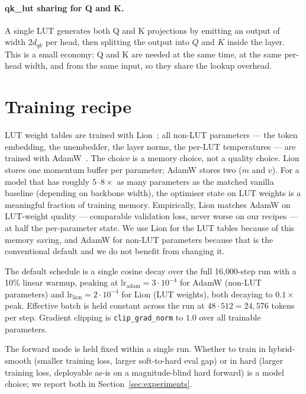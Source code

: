 \documentclass[11pt]{article}
\newcommand{\dqk}{d_{qk}}
\begin{document}
\paragraph{qk\_lut sharing for Q and K.} A single LUT generates both Q and K projections by emitting an output of width $2 \dqk$ per head, then splitting the output into $Q$ and $K$ inside the layer. This is a small economy: Q and K are needed at the same time, at the same per-head width, and from the same input, so they share the lookup overhead.

\FloatBarrier

\section{Training recipe}
\label{sec:training}

LUT weight tables are trained with Lion~\citep{chen2023lion}; all non-LUT parameters --- the token embedding, the unembedder, the layer norms, the per-LUT temperatures --- are trained with AdamW~\citep{loshchilov2017decoupled}. The choice is a memory choice, not a quality choice. Lion stores one momentum buffer per parameter; AdamW stores two ($m$ and $v$). For a model that has roughly $5$--$8\times$ as many parameters as the matched vanilla baseline (depending on backbone width), the optimiser state on LUT weights is a meaningful fraction of training memory. Empirically, Lion matches AdamW on LUT-weight quality --- comparable validation loss, never worse on our recipes --- at half the per-parameter state. We use Lion for the LUT tables because of this memory saving, and AdamW for non-LUT parameters because that is the conventional default and we do not benefit from changing it.

The default schedule is a single cosine decay over the full 16{,}000-step run with a 10\% linear warmup, peaking at $\mathrm{lr}_{\mathrm{adam}} = 3 \cdot 10^{-4}$ for AdamW (non-LUT parameters) and $\mathrm{lr}_{\mathrm{lion}} = 2 \cdot 10^{-4}$ for Lion (LUT weights), both decaying to $0.1\times$ peak. Effective batch is held constant across the run at $48 \cdot 512 = 24{,}576$ tokens per step. Gradient clipping is \texttt{clip\_grad\_norm} to $1.0$ over all trainable parameters.

The forward mode is held fixed within a single run. Whether to train in hybrid-smooth (smaller training loss, larger soft-to-hard eval gap) or in hard (larger training loss, deployable as-is on a magnitude-blind hard forward) is a model choice; we report both in Section~\ref{sec:experiments}.
\end{document}
